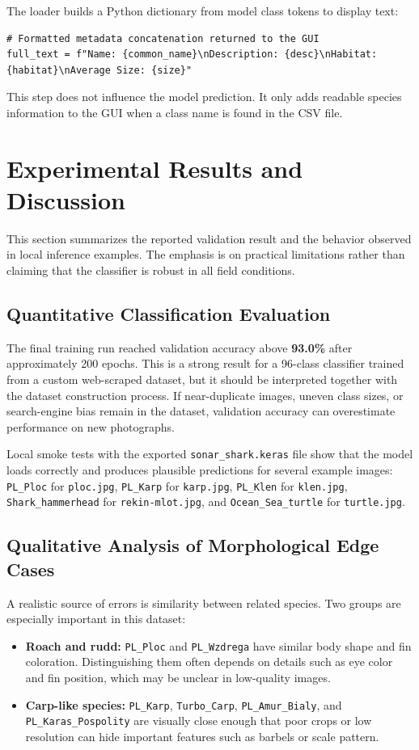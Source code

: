 \documentclass[11pt,a4paper,oneside]{article}
\begin{document}
The loader builds a Python dictionary from model class tokens to display text:
\begin{lstlisting}
# Formatted metadata concatenation returned to the GUI
full_text = f"Name: {common_name}\nDescription: {desc}\nHabitat: {habitat}\nAverage Size: {size}"
\end{lstlisting}
This step does not influence the model prediction. It only adds readable species information to the GUI when a class name is found in the CSV file.

\section{Experimental Results and Discussion}
\label{sec:results}

This section summarizes the reported validation result and the behavior observed in local inference examples. The emphasis is on practical limitations rather than claiming that the classifier is robust in all field conditions.

\subsection{Quantitative Classification Evaluation}
The final training run reached validation accuracy above \textbf{93.0\%} after approximately 200 epochs. This is a strong result for a 96-class classifier trained from a custom web-scraped dataset, but it should be interpreted together with the dataset construction process. If near-duplicate images, uneven class sizes, or search-engine bias remain in the dataset, validation accuracy can overestimate performance on new photographs.

Local smoke tests with the exported \texttt{sonar\_shark.keras} file show that the model loads correctly and produces plausible predictions for several example images: \texttt{PL\_Ploc} for \texttt{ploc.jpg}, \texttt{PL\_Karp} for \texttt{karp.jpg}, \texttt{PL\_Klen} for \texttt{klen.jpg}, \texttt{Shark\_hammerhead} for \texttt{rekin-mlot.jpg}, and \texttt{Ocean\_Sea\_turtle} for \texttt{turtle.jpg}.

\subsection{Qualitative Analysis of Morphological Edge Cases}
A realistic source of errors is similarity between related species. Two groups are especially important in this dataset:
\begin{itemize}
    \item \textbf{Roach and rudd:} \texttt{PL\_Ploc} and \texttt{PL\_Wzdrega} have similar body shape and fin coloration. Distinguishing them often depends on details such as eye color and fin position, which may be unclear in low-quality images.
    \item \textbf{Carp-like species:} \texttt{PL\_Karp}, \texttt{Turbo\_Carp}, \texttt{PL\_Amur\_Bialy}, and \texttt{PL\_Karas\_Pospolity} are visually close enough that poor crops or low resolution can hide important features such as barbels or scale pattern.
\end{itemize}
\end{document}
